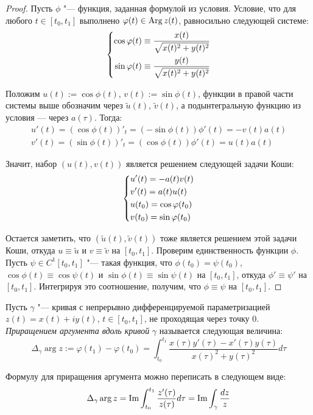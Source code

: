 \begin{proof}
	Пусть $\phi$ "--- функция, заданная формулой из условия. Условие, что для любого $t \in [t_0, t_1]$ выполнено $\varphi(t) \in \operatorname{Arg} z(t)$, равносильно следующей системе:
	\[\left\{\begin{aligned}
		\cos\varphi(t) \equiv \frac{x(t)}{\sqrt{x(t)^2 + y(t)^2}} \\
		\sin\varphi(t) \equiv \frac{y(t)}{\sqrt{x(t)^2 + y(t)^2}}
	\end{aligned}\right.\]
	
	Положим $u(t) := \cos\phi(t)$, $v(t) := \sin\phi(t)$, функции в правой части системы выше обозначим через $\widetilde u(t)$, $\widetilde v(t)$, а подынтегральную функцию из условия --- через $a(\tau)$. Тогда:
	\begin{gather*}
		u'(t) = (\cos\phi(t))'_t = (-\sin\phi(t))\phi'(t) = -v(t)a(t)\\
		v'(t) = (\sin\phi(t))'_t = (\cos\phi(t))\phi'(t) = u(t)a(t)
	\end{gather*}
	
	Значит, набор $(u(t), v(t))$ является решением следующей задачи Коши:
	\[\left\{\begin{aligned}
	&u'(t) = -a(t)v(t)\\
	&v'(t) = a(t)u(t)\\
	&u(t_0) = \cos\varphi(t_0)\\
	&v(t_0) = \sin\varphi(t_0)\end{aligned}\right.\]
	
	Остается заметить, что $(\widetilde u(t), \widetilde v(t))$ тоже является решением этой задачи Коши, откуда $u \equiv \widetilde u$ и $v \equiv \widetilde v$ на $[t_0, t_1]$. Проверим единственность функции $\phi$. Пусть $\psi \in C^1[t_0, t_1]$ "--- такая функция, что $\phi(t_0) = \psi(t_0)$, $\cos\phi(t) \equiv \cos\psi(t)$ и $\sin\phi(t) \equiv \sin\psi(t)$ на $[t_0, t_1]$, откуда $\phi' \equiv \psi'$ на $[t_0, t_1]$. Интегрируя это соотношение, получим, что $\phi \equiv \psi$ на $[t_0, t_1]$.
\end{proof}

\begin{definition}
	Пусть $\gamma$ "--- кривая с непрерывно дифференцируемой параметризацией $z(t) = x(t) + iy(t)$, $t \in [t_0, t_1]$, не проходящая через точку $0$. \textit{Приращением аргумента вдоль кривой} $\gamma$ называется следующая величина:
	\[\Delta_\gamma\arg{z} := \varphi(t_1) - \varphi(t_0) =  \int_{t_0}^{t_1}\frac{x(\tau)y'(\tau) - x'(\tau)y(\tau)}{x(\tau)^2 + y(\tau)^2}d\tau\]
\end{definition}

\begin{note}
	Формулу для приращения аргумента можно переписать в следующем виде:
	\[\Delta_\gamma \arg{z} = \operatorname{Im}\int_{t_0}^{t_1}\frac{z'(\tau)}{z(\tau)}d\tau = \operatorname{Im}\int_\gamma \frac{dz}{z}\]
\end{note}

